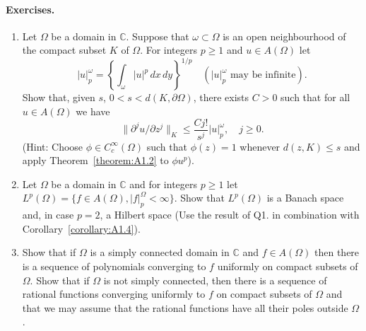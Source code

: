 \paragraph*{Exercises.}
\begin{enumerate}
\item Let $\Omega$ be a domain in $\mathbb C$. Suppose that $\omega\subset\Omega$ is an open neighbourhood of the compact subset $K$ of $\Omega$. For integers $p\geq1$ and $u\in A(\Omega)$ let
\[ |u|_p^\omega=\left\{\int_\omega|u|^p\,dx\,dy\right\}^{1/p}\quad(|u|_p^\omega\text{ may be infinite}). \]
Show that, given $s$, $0<s<d(K,\partial\Omega)$, there exists $C>0$ such that for all $u\in A(\Omega)$ we have
\[ \|\partial^j u/\partial z^j\|_K\leq\frac{Cj!}{s^j}|u|_p^\omega,\quad j\geq0. \]
(Hint: Choose $\phi\in C_c^\infty(\Omega)$ such that $\phi(z)=1$ whenever $d(z,K)\leq s$ and apply Theorem~\ref{theorem:A1.2} to $\phi u^p$).
\item Let $\Omega$ be a domain in $\mathbb C$ and for integers $p\geq1$ let $L^p(\Omega)=\{f\in A(\Omega),|f|_p^\Omega<\infty\}$. Show that $L^p(\Omega)$ is a Banach space and, in case $p=2$, a Hilbert space (Use the result of Q1. in combination with Corollary~\ref{corollary:A1.4}).
\item Show that if $\Omega$ is a simply connected domain in $\mathbb C$ and $f\in A(\Omega)$ then there is a sequence of polynomials converging to $f$ uniformly on compact subsets of $\Omega$. Show that if $\Omega$ is not simply connected, then there is a sequence of rational functions converging uniformly to $f$ on compact subsets of $\Omega$ and that we may assume that the rational functions have all their poles outside $\Omega$.
\end{enumerate}
